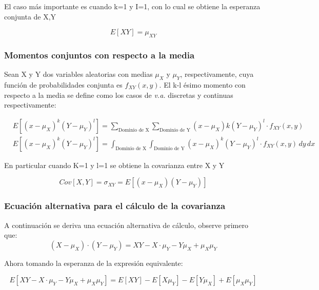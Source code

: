 El caso más importante es cuando k=1 y I=1, con lo cual
se obtiene la esperanza conjunta de X,Y

\begin{equation}
    E\left[XY \right]=\mu_{XY}
\end{equation}

\subsubsection{Momentos conjuntos con respecto a la media}


Sean X y Y dos variables aleatorias con medias $\mu_X$  y $\mu_Y$, respectivamente, cuya función de probabilidades conjunta es $f_{XY}\left( x,y\right)$. El k-l ésimo momento con respecto a la media se define como los casos de \textit{v.a.} discretas y continuas respectivamente:

\begin{align*}
     & E\left[ \left( x-\mu_X\right)^k\left( Y -\mu_Y\right)^l\right]= \sum_{\text{Dominio de X}}\sum_{\text{Dominio de Y}}\left(x-\mu_X\right) k\left( Y-\mu_Y\right)^l\cdot f_{XY}  \left(x,y\right)\\
     & E\left[ \left( x-\mu_X\right)^k\left( Y -\mu_Y\right)^l\right]= \int_{\text{Dominio de X}}\int_{\text{Dominio de Y}}\left(x-\mu_X\right)^k\left( Y-\mu_Y\right)^l\cdot f_{XY}  \left(x,y\right) \,dy\,dx
\end{align*}

En particular cuando K=1 y l=1 se obtiene la covarianza entre X y Y

\begin{equation}
    Cov \left[X ,Y\right]=\sigma_{XY}=E\left[ \left(x-\mu_X\right) \left( Y-\mu_Y\right)\right]
\end{equation}


\subsubsection{Ecuación alternativa para el cálculo de la covarianza}


A continuación se deriva una ecuación alternativa de cálculo, observe primero que:
\begin{equation*}
    \left( X-\mu_X\right) \cdot \left( Y -\mu_Y\right) =XY -X\cdot \mu_Y-Y \mu_X +\mu_X \mu_Y
\end{equation*}

Ahora tomando la esperanza de la expresión equivalente:

\begin{equation*}
    E\left[ XY-X\cdot \mu_Y-Y \mu_X +\mu_X \mu_Y\right]=E\left[XY \right]-E\left[X \mu_Y\right]-E\left[ Y \mu_X\right]+ E\left[ \mu_X \mu_Y\right]
\end{equation*}

